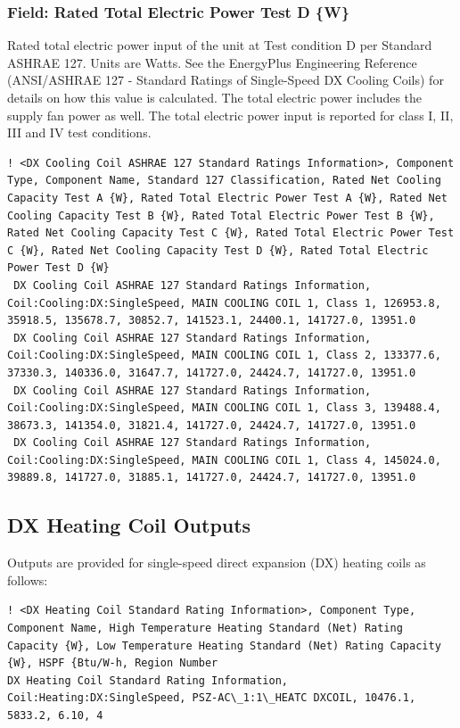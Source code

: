 \subsubsection{Field: Rated Total Electric Power Test D \{W\}}\label{field-rated-total-electric-power-test-d-w}

Rated total electric power input of the unit at Test condition D per Standard ASHRAE 127. Units are Watts. See the EnergyPlus Engineering Reference (ANSI/ASHRAE 127 - Standard Ratings of Single-Speed DX Cooling Coils) for details on how this value is calculated. The total electric power includes the supply fan power as well. The total electric power input is reported for class I, II, III and IV test conditions.

\begin{lstlisting}
! <DX Cooling Coil ASHRAE 127 Standard Ratings Information>, Component Type, Component Name, Standard 127 Classification, Rated Net Cooling Capacity Test A {W}, Rated Total Electric Power Test A {W}, Rated Net Cooling Capacity Test B {W}, Rated Total Electric Power Test B {W}, Rated Net Cooling Capacity Test C {W}, Rated Total Electric Power Test C {W}, Rated Net Cooling Capacity Test D {W}, Rated Total Electric Power Test D {W}
 DX Cooling Coil ASHRAE 127 Standard Ratings Information, Coil:Cooling:DX:SingleSpeed, MAIN COOLING COIL 1, Class 1, 126953.8, 35918.5, 135678.7, 30852.7, 141523.1, 24400.1, 141727.0, 13951.0
 DX Cooling Coil ASHRAE 127 Standard Ratings Information, Coil:Cooling:DX:SingleSpeed, MAIN COOLING COIL 1, Class 2, 133377.6, 37330.3, 140336.0, 31647.7, 141727.0, 24424.7, 141727.0, 13951.0
 DX Cooling Coil ASHRAE 127 Standard Ratings Information, Coil:Cooling:DX:SingleSpeed, MAIN COOLING COIL 1, Class 3, 139488.4, 38673.3, 141354.0, 31821.4, 141727.0, 24424.7, 141727.0, 13951.0
 DX Cooling Coil ASHRAE 127 Standard Ratings Information, Coil:Cooling:DX:SingleSpeed, MAIN COOLING COIL 1, Class 4, 145024.0, 39889.8, 141727.0, 31885.1, 141727.0, 24424.7, 141727.0, 13951.0
\end{lstlisting}

\subsection{DX Heating Coil Outputs}\label{dx-heating-coil-outputs}

Outputs are provided for single-speed direct expansion (DX) heating coils as follows:

\begin{lstlisting}
! <DX Heating Coil Standard Rating Information>, Component Type, Component Name, High Temperature Heating Standard (Net) Rating Capacity {W}, Low Temperature Heating Standard (Net) Rating Capacity {W}, HSPF {Btu/W-h, Region Number
DX Heating Coil Standard Rating Information, Coil:Heating:DX:SingleSpeed, PSZ-AC\_1:1\_HEATC DXCOIL, 10476.1, 5833.2, 6.10, 4
\end{lstlisting}

